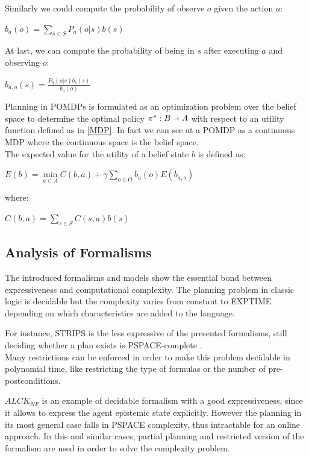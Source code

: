 \documentclass[pdftex,12pt,a4paper]{report}
\begin{document}
\noindent Similarly we could compute the probability of observe $o$ given the action $a$:
\begin{center}
\noindent $b_a(o) = \sum\limits_{s \in S} P_a(o|s)b(s)$ 
\end{center}

\noindent At last, we can compute the probability of being in $s$ after executing $a$ and observing $o$:
\begin{center}
\noindent $b_{a,o}(s) = \frac{P_a(o|s)b_s(s)}{b_a(o)}$ 
\end{center}

\noindent Planning in POMDPs is formulated as an optimization problem over the belief space to determine the optimal policy $\pi^* : B \shortrightarrow A$ with respect to an utility function defined as in \ref{MDP}. In fact we can see at a POMDP as a continuous MDP where the continuous space is the belief space.
\\\noindent The expected value for the utility of a belief state $b$ is defined as:
\begin{center}
\noindent $E(b) = \min\limits_{a \in A} C(b,a) + \gamma \sum\limits_{o \in O}b_a(o)E(b_{a,o})$ 
\end{center}
\noindent where:
\begin{center}
\noindent $C(b,a) = \sum\limits_{s \in S}C(s,a)b(s)$ 
\end{center}

\subsection{Analysis of Formalisms}\label{analysis}
The introduced formalisms and models show the essential bond between expressiveness and computational complexity. The planning problem in classic logic is decidable but the complexity varies from constant to EXPTIME depending on which characteristics are added to the language. 
\newline

\noindent For instance, STRIPS is the less expressive of the presented formalisms, still deciding whether a plan exists is PSPACE-complete \cite{bylander1994computational}.\\%
Many restrictions can be enforced in order to make this problem decidable in polynomial time, like restricting the type of formulas or the number of pre-postconditions. 
\newline

\noindent $ALCK_{NF}$ is an example of decidable formalism with a good expressiveness, since it allows to express the agent epistemic state explicitly. However the planning in its most general case falls in PSPACE complexity, thus intractable for an online approach. In this and similar cases, partial planning and restricted version of the formalism are used in order to solve the complexity problem.
\newline
\end{document}
